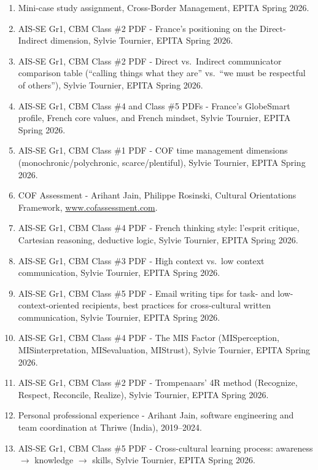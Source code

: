 \documentclass[12pt, a4paper]{article}
\begin{document}
\begin{enumerate}[noitemsep]
    \item Mini-case study assignment, Cross-Border Management, EPITA Spring 2026.
    \item AIS-SE Gr1, CBM Class \#2 PDF  -  France's positioning on the Direct-Indirect dimension, Sylvie Tournier, EPITA Spring 2026.
    \item AIS-SE Gr1, CBM Class \#2 PDF  -  Direct vs.\ Indirect communicator comparison table (``calling things what they are'' vs.\ ``we must be respectful of others''), Sylvie Tournier, EPITA Spring 2026.
    \item AIS-SE Gr1, CBM Class \#4 and Class \#5 PDFs  -  France's GlobeSmart profile, French core values, and French mindset, Sylvie Tournier, EPITA Spring 2026.
    \item AIS-SE Gr1, CBM Class \#1 PDF  -  COF time management dimensions (monochronic/\allowbreak polychronic, scarce/\allowbreak plentiful), Sylvie Tournier, EPITA Spring 2026.
    \item COF Assessment  -  Arihant Jain, Philippe Rosinski, Cultural Orientations Framework, \url{www.cofassessment.com}.
    \item AIS-SE Gr1, CBM Class \#4 PDF  -  French thinking style: l'esprit critique, Cartesian reasoning, deductive logic, Sylvie Tournier, EPITA Spring 2026.
    \item AIS-SE Gr1, CBM Class \#3 PDF  -  High context vs.\ low context communication, Sylvie Tournier, EPITA Spring 2026.
    \item AIS-SE Gr1, CBM Class \#5 PDF  -  Email writing tips for task- and low-context-oriented recipients, best practices for cross-cultural written communication, Sylvie Tournier, EPITA Spring 2026.
    \item AIS-SE Gr1, CBM Class \#4 PDF  -  The MIS Factor (MISperception, MISinterpretation, MISevaluation, MIStrust), Sylvie Tournier, EPITA Spring 2026.
    \item AIS-SE Gr1, CBM Class \#2 PDF  -  Trompenaars' 4R method (Recognize, Respect, Reconcile, Realize), Sylvie Tournier, EPITA Spring 2026.
    \item Personal professional experience  -  Arihant Jain, software engineering and team coordination at Thriwe (India), 2019--2024.
    \item AIS-SE Gr1, CBM Class \#5 PDF  -  Cross-cultural learning process: awareness $\rightarrow$ knowledge $\rightarrow$ skills, Sylvie Tournier, EPITA Spring 2026.
\end{enumerate}
\end{document}
